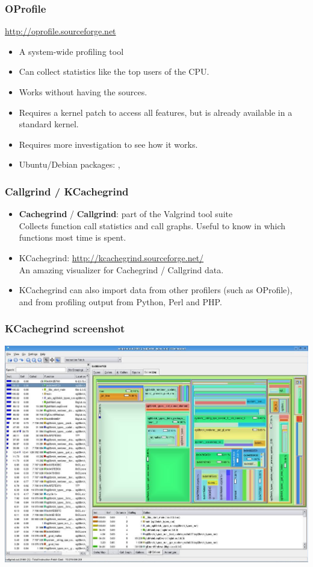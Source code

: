 \begin{frame}
  \frametitle{OProfile}
  \url{http://oprofile.sourceforge.net}
  \begin{itemize}
  \item A system-wide profiling tool
  \item Can collect statistics like the top users of the CPU.
  \item Works without having the sources.
  \item Requires a kernel patch to access all features, but is already
    available in a standard kernel.
  \item Requires more investigation to see how it works.
  \item Ubuntu/Debian packages: , 
  \end{itemize}
\end{frame}

\begin{frame}
  \frametitle{Callgrind / KCachegrind}
  \begin{itemize}
  \item {\bf Cachegrind} / {\bf Callgrind}: part of the Valgrind tool suite\\
    Collects function call statistics and call graphs. Useful to know
    in which functions most time is spent.
  \item KCachegrind: \url{http://kcachegrind.sourceforge.net/}\\
    An amazing visualizer for Cachegrind / Callgrind data.
  \item KCachegrind can also import data from other profilers (such as
    OProfile), and from profiling output from Python, Perl and PHP.
  \end{itemize}
\end{frame}

\begin{frame}
  \frametitle{KCachegrind screenshot}
  \begin{center}
    \includegraphics[width=\textwidth]{slides/sysdev-application-development/kcachegrind-screenshot.jpg}
  \end{center}
\end{frame}

